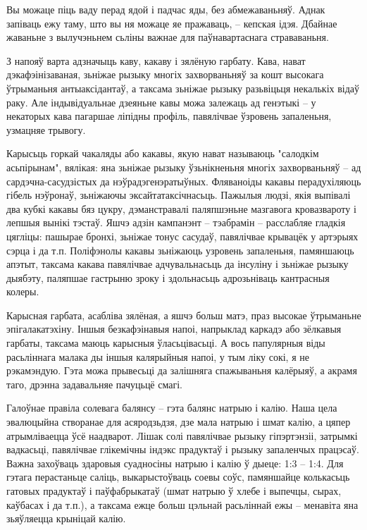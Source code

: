 Вы можаце піць ваду перад ядой і падчас яды, без абмежаваньняў. Аднак запіваць ежу таму, што вы ня можаце яе пражаваць, – кепская ідэя. Дбайнае жаваньне з вылучэньнем сьліны важнае для паўнавартаснага страваваньня.

З напояў варта адзначыць каву, какаву і зялёную гарбату. Кава, нават дэкафэінізаваная, зьніжае рызыку многіх захворваньняў за кошт высокага ўтрыманьня антыаксідантаў, а таксама зьніжае рызыку разьвіцьця некалькіх відаў раку. Але індывідуальнае дзеяньне кавы можа залежаць ад генэтыкі – у некаторых кава пагаршае ліпідны профіль, павялічвае ўзровень запаленьня, узмацняе трывогу.

Карысьць горкай чакаляды або какавы, якую нават называюць "салодкім асьпірынам", вялікая: яна зьніжае рызыку ўзьнікненьня многіх захворваньняў – ад сардэчна-сасудзістых да нэўрадэгенэратыўных. Фляваноіды какавы перадухіляюць гібель нэўронаў, зьніжаючы эксайтатаксічнасьць. Пажылыя людзі, якія выпівалі два кубкі какавы бяз цукру, дэманстравалі паляпшэньне мазгавога кровазвароту і лепшыя вынікі тэстаў. Яшчэ адзін кампанэнт – тэабрамін – расслабляе гладкія цягліцы: пашырае бронхі, зьніжае тонус сасудаў, павялічвае крывацёк у артэрыях сэрца і да т.п. Поліфэнолы какавы зьніжаюць узровень запаленьня, памяншаюць апэтыт, таксама какава павялічвае адчувальнасьць да інсуліну і зьніжае рызыку дыябэту, паляпшае гастрыню зроку і здольнасьць адрозьніваць кантрасныя колеры.

Карысная гарбата, асабліва зялёная, а яшчэ больш матэ, праз высокае ўтрыманьне эпігалакатэхіну. Іншыя безкафэінавыя напоі, напрыклад каркадэ або зёлкавыя гарбаты, таксама маюць карысныя ўласьцівасьці. А вось папулярныя віды расьліннага малака ды іншыя калярыйныя напоі, у тым ліку сокі, я не рэкамэндую. Гэта можа прывесьці да залішняга спажываньня калёрыяў, а акрамя таго, дрэнна задавальняе пачуцьцё смагі.

Галоўнае правіла солевага балянсу – гэта балянс натрыю і калію. Наша цела эвалюцыйна створанае для асяродзьдзя, дзе мала натрыю і шмат калію, а цяпер атрымліваецца ўсё наадварот. Лішак солі павялічвае рызыку гіпэртэнзіі, затрымкі вадкасьці, павялічвае глікемічны індэкс прадуктаў і рызыку запаленчых працэсаў. Важна захоўваць здаровыя суадносіны натрыю і калію ў дыеце: 1:3 – 1:4. Для гэтага перастаньце саліць, выкарыстоўваць соевы соўс, памяншайце колькасьць гатовых прадуктаў і паўфабрыкатаў (шмат натрыю ў хлебе і выпечцы, сырах, каўбасах і да т.п.), а таксама ежце больш цэльнай расьліннай ежы – менавіта яна зьяўляецца крыніцай калію.

